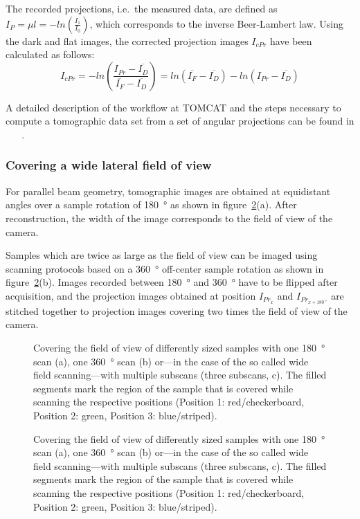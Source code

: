 The recorded projections, i.e.\ the measured data, are defined as $I_{P}=\mu l=-ln\left(\frac{I_{1}}{I_{0}}\right)$, which corresponds to the inverse Beer-Lambert law. Using the dark and flat images, the corrected projection images $I_{cPr}$ have been calculated as follows:
\begin{equation}
	I_{cPr} = -ln\left(\frac{I_{Pr}-\overline{I_{D}}}{\overline{I_{F}}-\overline{I_{D}}}\right)
	= ln(\overline{I_{F}}-\overline{I_{D}})-ln(I_{Pr}-\overline{I_{D}})
	\label{eq:cpr}
\end{equation}

A detailed description of the workflow at TOMCAT and the steps necessary to compute a tomographic data set from a set of angular projections can be found in%
\ifhtml
	~\citet{Hintermueller2009}
\else
	~
\fi%
.

\subsubsection{Covering a wide lateral field of view}%
For parallel beam geometry, tomographic images are obtained at equidistant angles over a sample rotation of \SI{180}{\degree} as shown in figure~\ref{fig:scanning-possibilities}(a). After reconstruction, the width of the image corresponds to the field of view of the camera.

Samples which are twice as large as the field of view can be imaged using scanning protocols based on a \SI{360}{\degree} off-center sample rotation as shown in figure~\ref{fig:scanning-possibilities}(b). Images recorded between \SI{180}{\degree} and \SI{360}{\degree} have to be flipped after acquisition, and the projection images obtained at position $I_{Pr_{x}}$ and $I_{Pr_{x+\SI{180}{\degree}}}$ are stitched together to projection images covering two times the field of view of the camera.

\ifiucr
	\begin{figure}
		\centering
		\caption{Covering the field of view of differently sized samples with one \SI{180}{\degree} scan (a), one \SI{360}{\degree} scan (b) or---in the case of the so called wide field scanning---with multiple subscans (three subscans, c). The filled segments mark the region of the sample that is covered while scanning the respective positions (Position 1: red/checkerboard, Position 2: green, Position 3: blue/striped).}%
		\label{fig:scanning-possibilities}%
	\end{figure}
\else
	\begin{figure}
		\label{subfig:scanning-possibilities}%
		\caption{Covering the field of view of differently sized samples with one \SI{180}{\degree} scan (a), one \SI{360}{\degree} scan (b) or---in the case of the so called wide field scanning---with multiple subscans (three subscans, c). The filled segments mark the region of the sample that is covered while scanning the respective positions (Position 1: red/checkerboard, Position 2: green, Position 3: blue/striped).}%
		\label{fig:scanning-possibilities}%
	\end{figure}
\fi

